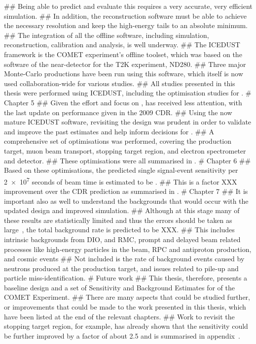 \begin{easylist}
## Being able to predict and evaluate this requires a very accurate, very efficient simulation.
## In addition, the reconstruction software must be able to achieve the necessary resolution and keep the high-energy tails to an absolute minimum.
## The integration of all the offline software, including simulation, reconstruction, calibration and analysis, is well underway.
## The ICEDUST framework is the COMET experiment's offline toolset, which was based on the software of the near-detector for the T2K experiment, ND280.
## Three major Monte-Carlo productions have been run using this software, which itself is now used collaboration-wide for various studies.
## All studies presented in this thesis were performed using ICEDUST, including the optimisation studies for \phaseII.
# Chapter 5
## Given the effort and focus on \phaseI,  \phaseII has received less attention, with the last update on performance given in the 2009 CDR.
## Using the now mature ICEDUST software, revisiting the \phaseII design was prudent in order to validate and improve the past estimates and help inform decisions for \phaseI.
## A comprehensive set of optimisations was performed, covering the production target, muon beam transport, stopping target region, and electron spectrometer and detector.
## These optimisations were all summarised in .
# Chapter 6
## Based on these optimisations, the predicted single signal-event sensitivity per \num{2e7} seconds of beam time is estimated to be \VarPredictedSES.
## This is a factor XXX improvement over the CDR prediction as summarised in .
# Chapter 7
## It is important also as well to understand the backgrounds that would occur with the updated design and improved simulation.
## Although at this stage many of these results are statistically limited and
    thus the errors should be taken as large~, the total background rate is predicted to be XXX.
## This includes intrinsic backgrounds from DIO, and RMC, prompt and delayed beam related processes like high-energy particles in the beam, RPC and antiproton production, and cosmic events
## Not included is the rate of background events caused by neutrons produced at the production target, and issues related to pile-up and particle miss-identification.
# Future work 
## This thesis, therefore, presents a baseline design and a set of Sensitivity and Background Estimates for \phaseII of the COMET Experiment.
## There are many aspects that could be studied further, or improvements that could be made to the work presented in this thesis, which have been listed at the end of the relevant chapters.
## Work to revisit the stopping target region, for example, has already shown that the sensitivity could be further improved by a factor of about 2.5 and is summarised in appendix~.
\end{easylist}
